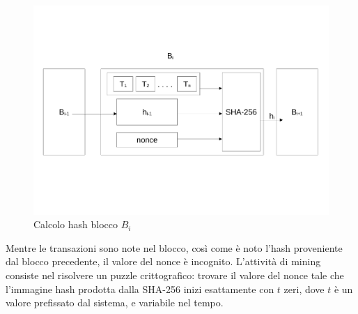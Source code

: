 \begin{figure}[h!]
    \centering
    \includegraphics[scale=0.4, trim = 1cm 4cm 0cm 4cm, clip]{Images/blocchi_sha.pdf}
    \caption{Calcolo hash blocco $B_i$}
    \label{fig:sha-256}
\end{figure}
\FloatBarrier
Mentre le transazioni sono note nel blocco, così come è noto l’hash proveniente dal blocco precedente, il valore del nonce è incognito. L’attività di mining consiste nel risolvere un puzzle crittografico: trovare il valore del nonce tale che l’immagine hash prodotta dalla SHA-256 inizi esattamente con $t$ zeri, dove $t$ è un valore prefissato dal sistema, e variabile nel tempo.\\
